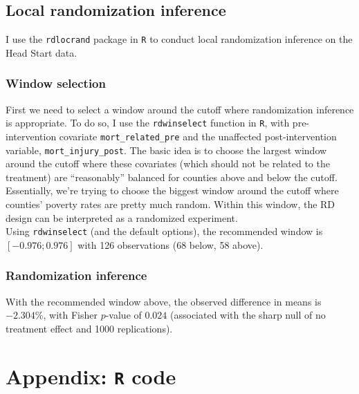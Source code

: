 \documentclass[12pt]{article}
\begin{document}
\subsection{Local randomization inference}
I use the \verb|rdlocrand| package in \verb|R| to conduct local randomization inference on the Head Start data.

\subsubsection{Window selection}
First we need to select a window around the cutoff where randomization inference is appropriate. To do so, I use the \verb|rdwinselect| function in \verb|R|, with pre-intervention covariate \verb|mort_related_pre| and the unaffected post-intervention variable, \verb|mort_injury_post|. The basic idea is to choose the largest window around the cutoff where these covariates (which should not be related to the treatment) are ``reasonably'' balanced for counties above and below the cutoff. Essentially, we're trying to choose the biggest window around the cutoff where counties' poverty rates are pretty much random. Within this window, the RD design can be interpreted as a randomized experiment.\\

Using \verb|rdwinselect| (and the default options), the recommended window is $[-0.976;0.976]$ with 126 observations (68 below, 58 above).

\subsubsection{Randomization inference}
With the recommended window above, the observed difference in means is $-2.304\%$, with Fisher $p$-value of $0.024$ (associated with the sharp null of no treatment effect and 1000 replications).


\newpage


\section{Appendix: \texttt{R} code}
\end{document}

